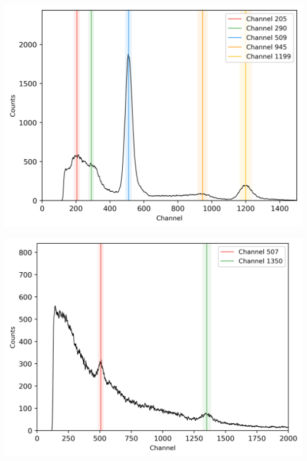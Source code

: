 \begin{center}
    \begin{adjustbox}{max width=\linewidth, keepaspectratio}
        \includegraphics[]{png/22Na}
    \end{adjustbox}
    \label{fig:}
\end{center}
%
\begin{center}
    \begin{adjustbox}{max width=\linewidth, keepaspectratio}
        \includegraphics[]{png/night}
    \end{adjustbox}
    \label{fig:}
\end{center}
%
